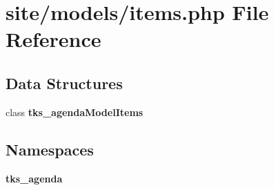 \section{site/models/items.php File Reference}
\label{site_2models_2items_8php}
\subsection*{Data Structures}
\begin{DoxyCompactItemize}
\item 
class \textbf{ tks\+\_\+agenda\+Model\+Items}
\end{DoxyCompactItemize}
\subsection*{Namespaces}
\begin{DoxyCompactItemize}
\item 
 \textbf{ tks\+\_\+agenda}
\end{DoxyCompactItemize}

